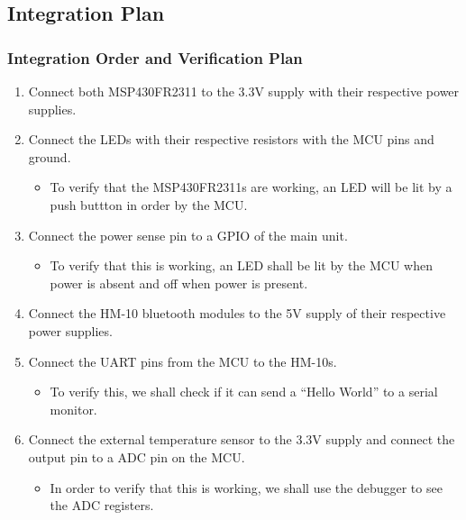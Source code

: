 \subsection{Integration Plan}
\subsubsection{Integration Order and Verification Plan}
\begin{enumerate}
  \item Connect both MSP430FR2311 to the 3.3\si{\V} supply with their respective power supplies.
  \item Connect the LEDs with their respective resistors with the MCU pins and ground.
        \begin{itemize}
         \item To verify that the MSP430FR2311s are working, an LED will be lit by a push buttton in order by the MCU.
        \end{itemize}
  \item Connect the power sense pin to a GPIO of the main unit.
        \begin{itemize}
         \item  To verify that this is working, an LED shall be lit by the MCU when power is absent and off when power is present.
        \end{itemize}
  \item Connect the HM-10 bluetooth modules to the 5\si{\V} supply of their respective power supplies.
  \item Connect the UART pins from the MCU to the HM-10s.
        \begin{itemize}
         \item To verify this, we shall check if it can send a ``Hello World'' to a serial monitor.
        \end{itemize}
  \item Connect the external temperature sensor to the 3.3\si{\V} supply and connect the output pin to a ADC pin on the MCU.
        \begin{itemize}
         \item In order to verify that this is working, we shall use the debugger to see the ADC registers.
        \end{itemize}
\end{enumerate}
